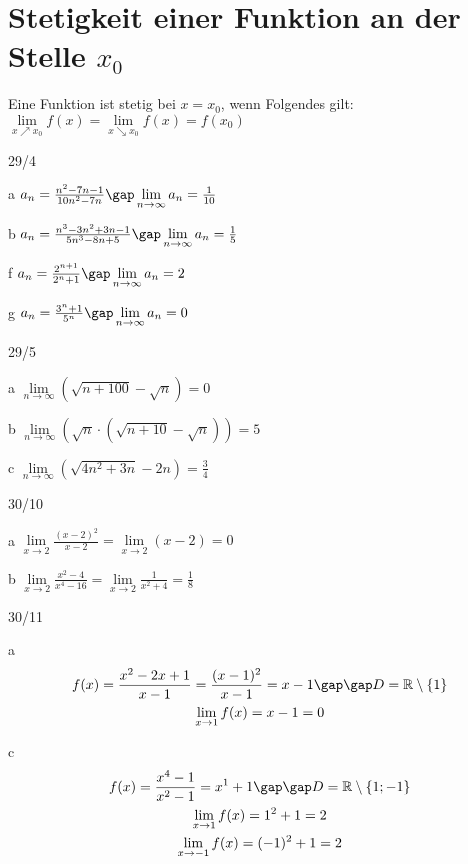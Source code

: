 \section{Stetigkeit einer Funktion an der Stelle $x_0$}
Eine Funktion ist stetig bei $x = x_0$, wenn Folgendes gilt: \\
$\lim\limits_{x \nearrow x_0} f(x) = \lim\limits_{x \searrow x_0} f(x) = f(x_0)$
\begin{exercise}{29/4}
  \item [a]
  $a_n = \frac{n^2 - 7n - 1}{10n^2 - 7n}\gap \lim\limits_{n \to \infty} a_n = \frac{1}{10}$
  \item [b]
  $a_n = \frac{n^3 - 3n^2 + 3n - 1}{5n^3 - 8n + 5}\gap \lim\limits_{n \to \infty} a_n = \frac{1}{5}$
  \item [f]
  $a_n = \frac{2^{n + 1}}{2^n + 1}\gap \lim\limits_{n \to \infty} a_n = 2$
  \item [g]
  $a_n = \frac{3^n + 1}{5^n}\gap \lim\limits_{n \to \infty} a_n = 0$
\end{exercise}
\begin{exercise}{29/5}
  \item [a]
  $\lim\limits_{n \to \infty} (\sqrt{n + 100} - \sqrt{n}) = 0$
  \item [b]
  $\lim\limits_{n \to \infty} (\sqrt{n} \cdot (\sqrt{n + 10} - \sqrt{n})) = 5$
  \item [c]
  $\lim\limits_{n \to \infty} (\sqrt{4n^2 + 3n} - 2n) = \frac{3}{4}$
\end{exercise}
\begin{exercise}{30/10}
  \item [a]
  $\lim\limits_{x \to 2} \frac{(x - 2)^2}{x - 2} = \lim\limits_{x \to 2} (x - 2) = 0$
  \item [b]
  $\lim\limits_{x \to 2} \frac{x^2 - 4}{x^4 - 16} = \lim\limits_{x \to 2} \frac{1}{x^2 + 4} = \frac{1}{8}$
\end{exercise}
\begin{exercise}{30/11}
  \item [a]
  \begin{gather*}
    f(x) = \frac{x^2 - 2x + 1}{x - 1} = \frac{(x - 1)^2}{x - 1} = x - 1 \gap\gap D = \mathbb{R} \setminus \{1\} \\
    \lim\limits_{x \to 1} f(x) = x - 1 = 0
  \end{gather*}
  \item [c]
  \begin{gather*}
    f(x) = \frac{x^4 - 1}{x^2 - 1} = x^1 + 1 \gap\gap D = \mathbb{R} \setminus \{1; -1\} \\
    \lim\limits_{x \to 1} f(x) = 1^2 + 1 = 2 \\
    \lim\limits_{x \to -1} f(x) = (-1)^2 + 1 = 2
  \end{gather*}
\end{exercise}
